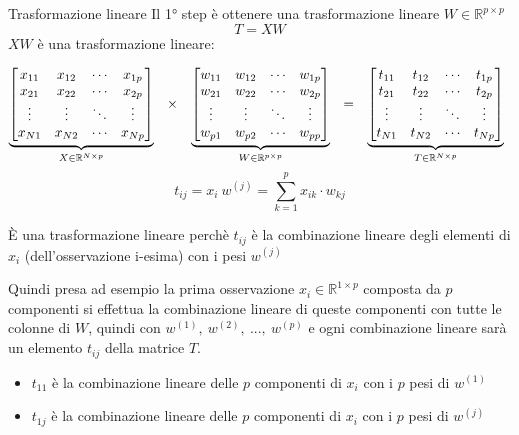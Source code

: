 	\begin{mybox2}{Trasformazione lineare}
		Il 1° step è ottenere una trasformazione lineare $W\in\mathbb{R}^{p\times p}$
		$$
		T=XW
		$$
		$XW$ è una trasformazione lineare:
		
		$$
		\begin{matrix}
			\underbrace{\begin{bmatrix}
					x_{11} & x_{12} & \cdots & x_{1p} \\
					x_{21} & x_{22} & \cdots & x_{2p} \\
					\vdots & \vdots & \ddots & \vdots \\
					x_{N1} & x_{N2} & \cdots & x_{Np}
			\end{bmatrix}}_{X \in \mathbb{R}^{N \times p}}
			&
			\times
			&
			\underbrace{\begin{bmatrix}
					w_{11} & w_{12} & \cdots & w_{1p} \\
					w_{21} & w_{22} & \cdots & w_{2p} \\
					\vdots & \vdots & \ddots & \vdots \\
					w_{p1} & w_{p2} & \cdots & w_{pp}
			\end{bmatrix}}_{W \in \mathbb{R}^{p \times p}}
			&
			=
			&
			\underbrace{\begin{bmatrix}
					t_{11} & t_{12} & \cdots & t_{1p} \\
					t_{21} & t_{22} & \cdots & t_{2p} \\
					\vdots & \vdots & \ddots & \vdots \\
					t_{N1} & t_{N2} & \cdots & t_{Np}
			\end{bmatrix}}_{T \in \mathbb{R}^{N \times p}}
		\end{matrix}\sep
		$$
		$$
		t_{ij}=x_i\ w^{(j)}=\sum_{k=1}^px_{ik}\cdot w_{kj}
		$$
		
		È una trasformazione lineare perchè $t_{ij}$ è la combinazione lineare degli elementi di $x_i$ (dell’osservazione i-esima) con i pesi $w^{(j)}$
	\end{mybox2}
	
	Quindi presa ad esempio la prima osservazione $x_i\in\mathbb{R}^{1\times p}$ composta da $p$ componenti si effettua la combinazione lineare di queste componenti con tutte le colonne di $W$, quindi con $w^{(1)},\ w^{(2)},\ ...,\ w^{(p)}$ e ogni combinazione lineare sarà un elemento $t_{ij}$ della matrice $T$.
	
	\begin{itemize}[itemsep=3pt, topsep=3pt]
	  \item $t_{11}$ è la combinazione lineare delle $p$ componenti di $x_i$ con i $p$ pesi di $w^{(1)}$
	  \item $t_{1j}$ è la combinazione lineare delle $p$ componenti di $x_i$ con i $p$ pesi di $w^{(j)}$
	\end{itemize}
	
